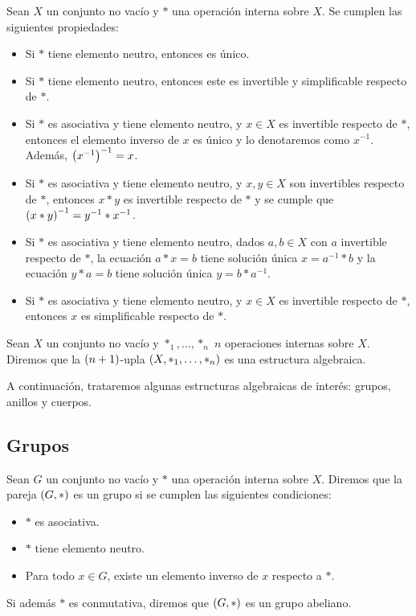 \begin{proposition}
  \rm Sean $X$ un conjunto no vacío y $\ast$ una operación interna sobre $X$. Se cumplen las siguientes propiedades:

  \begin{itemize}
    \item Si $\ast$ tiene elemento neutro, entonces es único.
    \item Si $\ast$ tiene elemento neutro, entonces este es invertible y simplificable respecto de $\ast$.
    \item Si $\ast$ es asociativa y tiene elemento neutro, y $x\in X$ es invertible respecto de $\ast$, entonces el elemento inverso de $x$ es único y lo denotaremos como $x^{-1}$. Además, $\left(x^{-1}\right)^{-1}=x$.
    \item Si $\ast$ es asociativa y tiene elemento neutro, y $x,y\in X$ son invertibles respecto de $\ast$, entonces $x\ast y$ es invertible respecto de $\ast$ y se cumple que $\left(x\ast y\right)^{-1}=y^{-1}\ast x^{-1}$. 
    \item Si $\ast$ es asociativa y tiene elemento neutro, dados $a,b\in X$ con $a$ invertible respecto de $\ast$, la ecuación $a\ast x=b$ tiene solución única $x=a^{-1}\ast b$ y la ecuación $y\ast a=b$ tiene solución única $y=b\ast a^{-1}$.
    \item Si $\ast$ es asociativa y tiene elemento neutro, y $x\in X$ es invertible respecto de $\ast$, entonces $x$ es simplificable respecto de $\ast$.
  \end{itemize}
\end{proposition}

\begin{definition}
  \rm Sean $X$ un conjunto no vacío y $\ast_1,\dots,\ast_n$ $n$ operaciones internas sobre $X$. Diremos que la $\left(n+1\right)$-upla $\left(X,\ast_1,\dots,\ast_n\right)$ es una estructura algebraica.
\end{definition}

A continuación, trataremos algunas estructuras algebraicas de interés: grupos, anillos y cuerpos.

\subsection{Grupos}

\begin{definition}
  \rm Sean $G$ un conjunto no vacío y $\ast$ una operación interna sobre $X$. Diremos que la pareja $\left(G,\ast\right)$ es un grupo si se cumplen las siguientes condiciones:

  \begin{itemize}
    \item[1.] $\ast$ es asociativa.
    \item[2.] $\ast$ tiene elemento neutro.
    \item[3.] Para todo $x\in G$, existe un elemento inverso de $x$ respecto a $\ast$.
  \end{itemize}

  Si además $\ast$ es conmutativa, diremos que $\left(G,\ast\right)$ es un grupo abeliano.
\end{definition}

